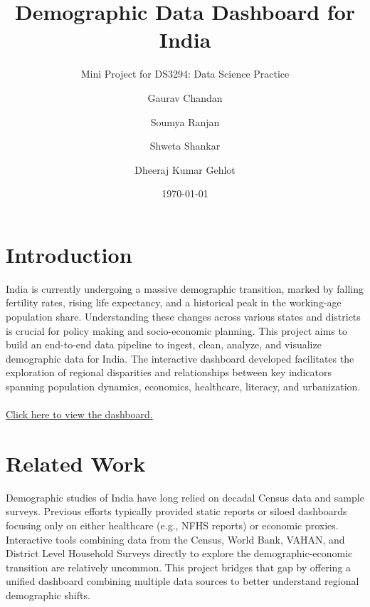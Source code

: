 \documentclass[abstract=true]{scrartcl}
\subtitle{Mini Project for DS3294: Data Science Practice}
\date{\small \today}
\title{Demographic Data Dashboard for India}
\author{
    \small Gaurav Chandan \and
    \small Soumya Ranjan \and
    \small Shweta Shankar \and
    \small Dheeraj Kumar Gehlot
    }
\begin{document}
\maketitle




\section{Introduction}
India is currently undergoing a massive demographic transition, marked by falling fertility rates, rising life expectancy, and a historical peak in the working-age population share. Understanding these changes across various states and districts is crucial for policy making and socio-economic planning. This project aims to build an end-to-end data pipeline to ingest, clean, analyze, and visualize demographic data for India. The interactive dashboard developed facilitates the exploration of regional disparities and relationships between key indicators spanning population dynamics, economics, healthcare, literacy, and urbanization.
\\\\
\href{https://indiametrics.streamlit.app}{Click here to view the dashboard.}

\section{Related Work}
Demographic studies of India have long relied on decadal Census data and sample surveys. Previous efforts typically provided static reports or siloed dashboards focusing only on either healthcare (e.g., NFHS reports) or economic proxies. Interactive tools combining data from the Census, World Bank, VAHAN, and District Level Household Surveys directly to explore the demographic-economic transition are relatively uncommon. This project bridges that gap by offering a unified dashboard combining multiple data sources to better understand regional demographic shifts.
\end{document}
